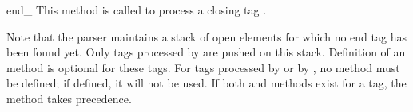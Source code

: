 \begin{methoddescni}{end_}{}
This method is called to process a closing tag .
\end{methoddescni}

Note that the parser maintains a stack of open elements for which no
end tag has been found yet.  Only tags processed by
 are pushed on this stack.  Definition of an
 method is optional for these tags.  For tags
processed by  or by , no
 method must be defined; if defined, it will
not be used.  If both  and
 methods exist for a tag, the
 method takes precedence.

